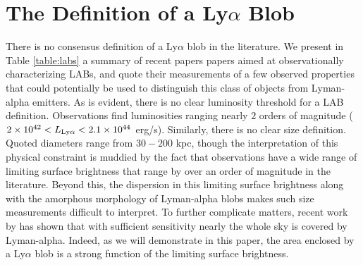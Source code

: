 \section{The Definition of a Ly\texorpdfstring{$\alpha$}{a} Blob}
\label{sec:blob_definition}
There is no consensus definition of a Ly$\alpha$ blob in the literature.
We present in Table \ref{table:labs} a summary of recent papers papers aimed at observationally characterizing LABs, and quote their measurements of a few observed properties that could potentially be used to distinguish this class of objects from Lyman-alpha emitters.
As is evident, there is no clear luminosity threshold for a LAB definition.
Observations find luminosities ranging nearly $2$
orders of magnitude ($2\times10^{42}<L_{\rm Ly\alpha}<2.1\times10^{44}$ erg/s).
Similarly, there is no clear size definition.
Quoted diameters range from $30-200$ kpc, though the interpretation of this physical constraint is muddied by the fact that observations have a wide range of limiting surface brightness that range by over an order of magnitude in the literature.
Beyond this, the dispersion in this limiting surface brightness along with the amorphous morphology of Lyman-alpha blobs makes such size measurements difficult to interpret.
To further complicate matters, recent work by \citet{Wisotzki2018} has shown that with sufficient sensitivity nearly the whole sky is covered by Lyman-alpha.
Indeed, as we will demonstrate in this paper, the area enclosed by a Ly$\alpha$ blob is a strong function of the limiting surface brightness.

